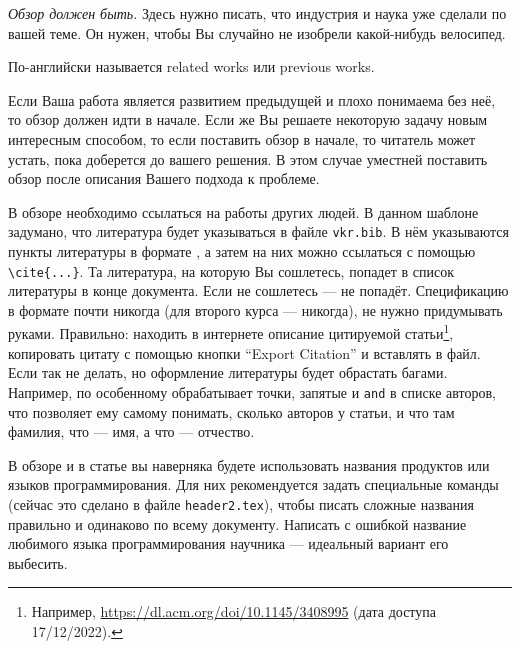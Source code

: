 
\label{sec:relatedworks}
\emph{Обзор должен быть.} Здесь нужно писать, что индустрия и наука уже сделали по вашей теме. Он нужен, чтобы Вы случайно не изобрели какой-нибудь велосипед.

По-английски называется related works или previous works.

Если Ваша работа является развитием предыдущей и плохо понимаема без неё, то обзор должен идти в начале. Если же Вы решаете некоторую задачу новым интересным способом, то если поставить обзор в начале, то читатель может устать, пока доберется до вашего решения. В этом случае уместней поставить обзор после описания Вашего подхода к проблеме.

В обзоре необходимо ссылаться на работы других людей. В данном шаблоне задумано, что литература будет указываться в файле \verb=vkr.bib=. В нём указываются пункты литературы в формате \BibTeX{}, а затем на них можно ссылаться с помощью \verb=\cite{...}=. Та литература, на которую Вы сошлетесь, попадет в список литературы в конце документа. Если не сошлетесь ---  не попадёт. Спецификацию в формате \BibTeX{} почти никогда (для второго курса --- никогда), не нужно придумывать руками. Правильно: находить в интернете описание цитируемой статьи\footnote{Например, \url{https://dl.acm.org/doi/10.1145/3408995} (дата доступа 17/12/2022).},
копировать цитату с помощью кнопки ``Export Citation'' и вставлять в \BibTeX{} файл. Если так не делать, но оформление литературы будет обрастать багами. Например, \BibTeX{} по особенному обрабатывает точки, запятые и \verb=and= в списке авторов, что позволяет ему самому понимать, сколько авторов у статьи, и что там фамилия, что --- имя, а что --- отчество.

В обзоре и в статье вы наверняка будете использовать названия продуктов или языков программирования. Для них рекомендуется задать специальные команды (сейчас это сделано в файле \verb=header2.tex=), чтобы писать сложные названия правильно и одинаково по всему документу. Написать с ошибкой  название любимого языка программирования научника --- идеальный вариант его выбесить.

